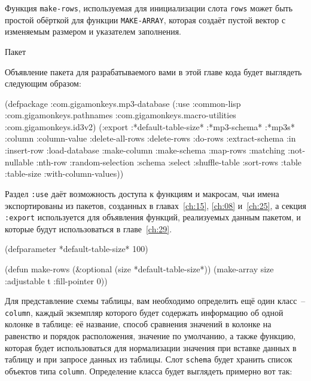 Функция \lstinline{make-rows}, используемая для инициализации слота \lstinline{rows} может быть
простой обёрткой для функции \lstinline{MAKE-ARRAY}, которая создаёт пустой вектор с изменяемым
размером и указателем заполнения.

Пакет

Объявление пакета для разрабатываемого вами в этой главе кода будет выглядеть следующим образом:

\begin{myverb}
(defpackage :com.gigamonkeys.mp3-database
  (:use :common-lisp 
        :com.gigamonkeys.pathnames
        :com.gigamonkeys.macro-utilities
        :com.gigamonkeys.id3v2)
  (:export  :*default-table-size*
            :*mp3-schema*
            :*mp3s*
            :column
            :column-value
            :delete-all-rows
            :delete-rows
            :do-rows
            :extract-schema
            :in
            :insert-row
            :load-database
            :make-column
            :make-schema
            :map-rows
            :matching
            :not-nullable
            :nth-row
            :random-selection
            :schema
            :select
            :shuffle-table
            :sort-rows
            :table
            :table-size
            :with-column-values))
\end{myverb}

Раздел \lstinline{:use} даёт возможность доступа к функциям и макросам, чьи имена
экспортированы из пакетов, созданных в главах~\ref{ch:15}, \ref{ch:08} и~\ref{ch:25}, а
секция \lstinline{:export} используется для объявления функций, реализуемых данным пакетом, и
которые будут использоваться в главе~\ref{ch:29}.


\begin{myverb}
(defparameter *default-table-size* 100)

(defun make-rows (&optional (size *default-table-size*))
  (make-array size :adjustable t :fill-pointer 0))
\end{myverb}

Для представление схемы таблицы, вам необходимо определить ещё один класс~--
\lstinline{column}, каждый экземпляр которого будет содержать информацию об одной колонке в
таблице: её название, способ сравнения значений в колонке на равенство и порядок
расположения, значение по умолчанию, а также функцию, которая будет использоваться для
нормализации значения при вставке данных в таблицу и при запросе данных из таблицы. Слот
\lstinline{schema} будет хранить список объектов типа \lstinline{column}.  Определение класса будет
выглядеть примерно вот так:

